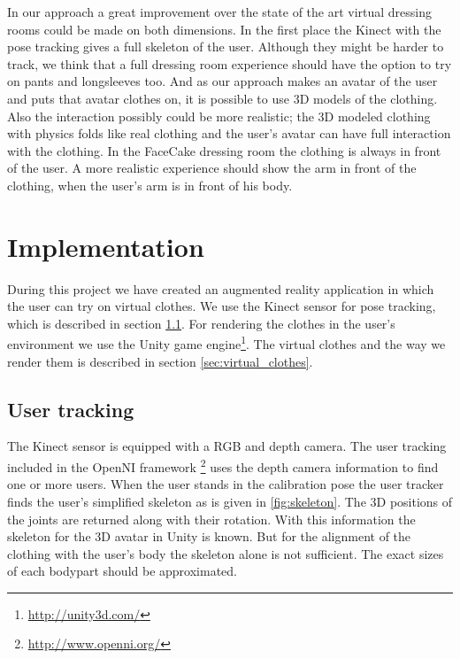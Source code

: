 \documentclass[twocolumn,a4paper]{article}
\begin{document}
In our approach a great improvement over the state of the art virtual dressing rooms could be made on both dimensions. In the first place the Kinect with the pose tracking gives a full skeleton of the user. Although they might be harder to track, we think that a full dressing room experience should have the option to try on pants and longsleeves too. And as our approach makes an avatar of the user and puts that avatar clothes on, it is possible to use 3D models of the clothing. Also the interaction possibly could be more realistic; the 3D modeled clothing with physics folds like real clothing and the user's avatar can have full interaction with the clothing.
In the FaceCake dressing room the clothing is always in front of the user. A more realistic experience should show the arm in front of the clothing, when the user's arm is in front of his body.

\section{Implementation}
\label{sec:implementation}

During this project we have created an augmented reality application in which the user can try on virtual clothes. We use the Kinect sensor for pose tracking, which is described in section \ref{sec:user_tracking}. For rendering the clothes in the user's environment we use the Unity game engine\footnote{\url{http://unity3d.com/}}. The virtual clothes and the way we render them is described in section \ref{sec:virtual_clothes}.

\subsection{User tracking}
\label{sec:user_tracking}

The Kinect sensor is equipped with a RGB and depth camera. The user tracking included in the OpenNI framework \footnote{\url{http://www.openni.org/}} uses the depth camera information to find one or more users. When the user stands in the calibration pose the user tracker finds the user's simplified skeleton as is given in \ref{fig:skeleton}. The 3D positions of the joints are returned along with their rotation. With this information the skeleton for the 3D avatar in Unity is known. But for the alignment of the clothing with the user's body the skeleton alone is not sufficient. The exact sizes of each bodypart should be approximated.
\end{document}
